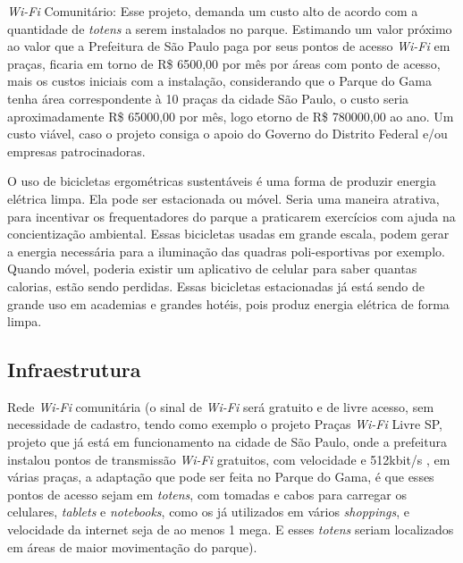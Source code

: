 \textit{Wi-Fi} Comunit\'ario: Esse projeto, demanda um custo alto de acordo com a quantidade de \textit{totens} a serem instalados no parque. Estimando um valor pr\'oximo ao valor que a Prefeitura de S\~ao Paulo paga por seus pontos de acesso \textit{Wi-Fi} em pra\c{c}as, ficaria em torno de R\$ 6500,00 por m\^es por \'areas com ponto de acesso, mais os custos iniciais com a instala\c{c}\~ao, considerando que o Parque do Gama tenha \'area correspondente \`a 10 pra\c{c}as da cidade S\~ao Paulo, o custo seria aproximadamente R\$ 65000,00 por m\^es, logo etorno de R\$ 780000,00 ao ano. Um custo vi\'avel, caso o projeto consiga o apoio do Governo do Distrito Federal e/ou empresas patrocinadoras.

	O uso de bicicletas ergom\'etricas sustent\'aveis \'e uma forma de produzir energia el\'etrica limpa. Ela pode ser estacionada ou m\'ovel. Seria uma maneira atrativa, para incentivar os frequentadores do parque a praticarem exerc\'icios com ajuda na concientiza\c{c}\~ao ambiental. Essas bicicletas usadas em grande escala, podem gerar a energia necess\'aria para a ilumina\c{c}\~ao das quadras poli-esportivas por exemplo. Quando m\'ovel, poderia existir um aplicativo de celular para saber quantas calorias, est\~ao sendo perdidas. Essas bicicletas estacionadas j\'a est\'a sendo de grande uso em academias e grandes hot\'eis, pois produz energia el\'etrica de forma limpa.

\subsection{Infraestrutura}

Rede \textit{Wi-Fi} comunit\'aria (o sinal de \textit{Wi-Fi} ser\'a gratuito e de livre acesso, sem necessidade de cadastro, tendo como exemplo o projeto Pra\c{c}as \textit{Wi-Fi} Livre SP, projeto que j\'a est\'a em funcionamento na cidade de S\~ao Paulo, onde a prefeitura instalou pontos de transmiss\~ao \textit{Wi-Fi} gratuitos, com velocidade e 512kbit/s , em v\'arias pra\c{c}as, a adapta\c{c}\~ao que pode ser feita no Parque do Gama, \'e que esses pontos de acesso sejam em \textit{totens}, com tomadas e cabos para carregar os celulares, \textit{tablets} e \textit{notebooks}, como os j\'a utilizados em v\'arios \textit{shoppings}, e velocidade da internet seja de ao menos 1 mega. E esses \textit{totens} seriam localizados em \'areas de maior movimenta\c{c}\~ao do parque). 